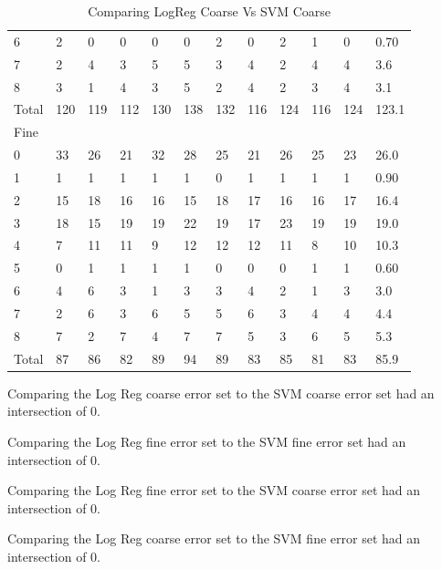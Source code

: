 \documentclass[ms]{nuthesis}
\begin{document}
\begin{table}[h]
\begin{tabular}{|l||l||l||l||l||l||l||l||l||l||l||l|}
    6 & 2 & 0 & 0 & 0 & 0 & 2 & 0 & 2 & 1 & 0 & 0.70 \\
    7 & 2 & 4 & 3 & 5 & 5 & 3 & 4 & 2 & 4 & 4 & 3.6 \\
    8 & 3 & 1 & 4 & 3 & 5 & 2 & 4 & 2 & 3 & 4 & 3.1 \\
    Total & 120 & 119 & 112 & 130 & 138 & 132 & 116 & 124 & 116 & 124 & 123.1 \\
    Fine &  &  &  &  &  &  &  &  &  &  &  \\
    0 & 33 & 26 & 21 & 32 & 28 & 25 & 21 & 26 & 25 & 23 & 26.0 \\
    1 & 1 & 1 & 1 & 1 & 1 & 0 & 1 & 1 & 1 & 1 & 0.90 \\
    2 & 15 & 18 & 16 & 16 & 15 & 18 & 17 & 16 & 16 & 17 & 16.4 \\
    3 & 18 & 15 & 19 & 19 & 22 & 19 & 17 & 23 & 19 & 19 & 19.0 \\
    4 & 7 & 11 & 11 & 9 & 12 & 12 & 12 & 11 & 8 & 10 & 10.3 \\
    5 & 0 & 1 & 1 & 1 & 1 & 0 & 0 & 0 & 1 & 1 & 0.60 \\
    6 & 4 & 6 & 3 & 1 & 3 & 3 & 4 & 2 & 1 & 3 & 3.0 \\
    7 & 2 & 6 & 3 & 6 & 5 & 5 & 6 & 3 & 4 & 4 & 4.4 \\
    8 & 7 & 2 & 7 & 4 & 7 & 7 & 5 & 3 & 6 & 5 & 5.3 \\
    Total & 87 & 86 & 82 & 89 & 94 & 89 & 83 & 85 & 81 & 83 & 85.9 \\ \bottomrule
  \end{tabular}
  \caption{Comparing LogReg Coarse Vs SVM Coarse}
  \label{tab:SVM}
\end{table}
\FloatBarrier


\par Comparing the Log Reg coarse error set to the SVM coarse error set had
an intersection of 0.

\par Comparing the Log Reg fine error set to the SVM fine error set had
an intersection of 0.

\par Comparing the Log Reg fine error set to the SVM coarse error set had
an intersection of 0.

\par Comparing the Log Reg coarse error set to the SVM fine error set had
an intersection of 0.
\end{document}
